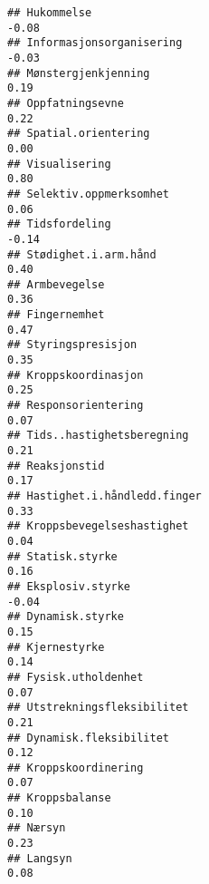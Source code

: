 \documentclass[
]{article}
\begin{document}
\begin{verbatim}
## Hukommelse                                                                       -0.08
## Informasjonsorganisering                                                         -0.03
## Mønstergjenkjenning                                                               0.19
## Oppfatningsevne                                                                   0.22
## Spatial.orientering                                                               0.00
## Visualisering                                                                     0.80
## Selektiv.oppmerksomhet                                                            0.06
## Tidsfordeling                                                                    -0.14
## Stødighet.i.arm.hånd                                                              0.40
## Armbevegelse                                                                      0.36
## Fingernemhet                                                                      0.47
## Styringspresisjon                                                                 0.35
## Kroppskoordinasjon                                                                0.25
## Responsorientering                                                                0.07
## Tids..hastighetsberegning                                                         0.21
## Reaksjonstid                                                                      0.17
## Hastighet.i.håndledd.finger                                                       0.33
## Kroppsbevegelseshastighet                                                         0.04
## Statisk.styrke                                                                    0.16
## Eksplosiv.styrke                                                                 -0.04
## Dynamisk.styrke                                                                   0.15
## Kjernestyrke                                                                      0.14
## Fysisk.utholdenhet                                                                0.07
## Utstrekningsfleksibilitet                                                         0.21
## Dynamisk.fleksibilitet                                                            0.12
## Kroppskoordinering                                                                0.07
## Kroppsbalanse                                                                     0.10
## Nærsyn                                                                            0.23
## Langsyn                                                                           0.08

\end{verbatim}
\end{document}
